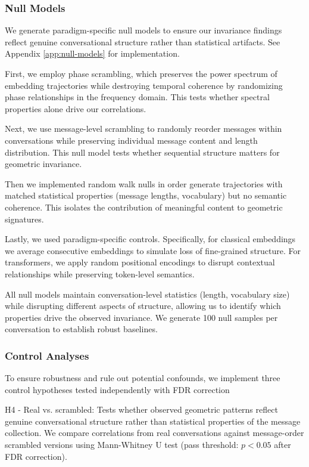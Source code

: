 \documentclass[11pt,letterpaper]{article}
\begin{document}
\subsubsection{Null Models}

We generate paradigm-specific null models to ensure our invariance findings reflect genuine conversational structure rather than statistical artifacts. See Appendix \ref{app:null-models} for implementation.

First, we employ phase scrambling, which preserves the power spectrum of embedding trajectories while destroying temporal coherence by randomizing phase relationships in the frequency domain. This tests whether spectral properties alone drive our correlations. 

Next, we use message-level scrambling to randomly reorder messages within conversations while preserving individual message content and length distribution. This null model tests whether sequential structure matters for geometric invariance.

Then we implemented random walk nulls in order generate trajectories with matched statistical properties (message lengths, vocabulary) but no semantic coherence. This isolates the contribution of meaningful content to geometric signatures.

Lastly, we used paradigm-specific controls. Specifically, for classical embeddings we average consecutive embeddings to simulate loss of fine-grained structure. For transformers, we apply random positional encodings to disrupt contextual relationships while preserving token-level semantics.

All null models maintain conversation-level statistics (length, vocabulary size) while disrupting different aspects of structure, allowing us to identify which properties drive the observed invariance. We generate 100 null samples per conversation to establish robust baselines.

\subsubsection{Control Analyses}

To ensure robustness and rule out potential confounds, we implement three control hypotheses tested independently with FDR correction

H4 - Real vs. scrambled: Tests whether observed geometric patterns reflect genuine conversational structure rather than statistical properties of the message collection. We compare correlations from real conversations against message-order scrambled versions using Mann-Whitney U test (pass threshold: $p < 0.05$ after FDR correction).
\end{document}
